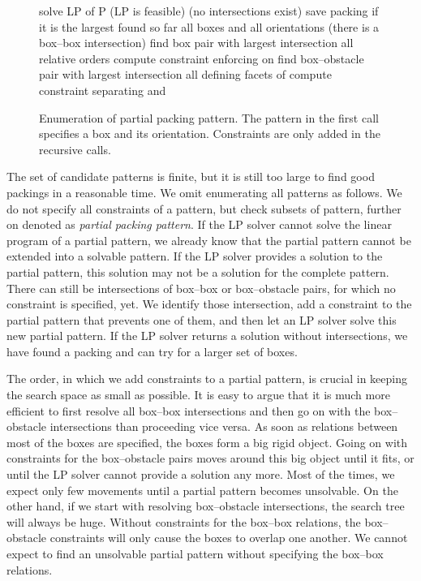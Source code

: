 \documentclass{article}
\begin{document}
\begin{figure}
\begin{codebox}
\Procname{}
\li solve LP of P
\li \If (LP is feasible) \Indentmore
\li \If (no intersections exist) \Indentmore
\li save packing if it is the largest found so far 
\li \For all boxes  and all orientations  \Indentmore
\li  \End
\li \Else \If(there is a box--box intersection)
\li  find box pair  with largest intersection
\li \For all relative orders  \Indentmore
\li compute constraint  enforcing  on 
\li  \End
\li \Else find box--obstacle pair  with largest intersection
\li \For all defining facets of  \Indentmore
\li compute constraint  separating  and 
\li  \End \End \End
\end{codebox}
\caption{\label{fig:patternEnumeration} Enumeration of partial packing
  pattern. The pattern in the first call specifies a box and its
  orientation. Constraints are only added in the recursive calls.}
\end{figure}

The set of candidate patterns is finite, but it is still too large to
find good packings in a reasonable time. We omit enumerating all
patterns as follows. We do not specify all constraints of a pattern,
but check subsets of pattern, further on denoted as \emph{partial
packing pattern}. If the LP solver cannot solve the linear program of
a partial pattern, we already know that the partial pattern cannot be
extended into a solvable pattern. If the LP solver provides a solution
to the partial pattern, this solution may not be a solution for the
complete pattern. There can still be intersections of box--box or
box--obstacle pairs, for which no constraint is specified, yet. We
identify those intersection, add a constraint to the partial pattern
that prevents one of them, and then let an LP solver solve this new
partial pattern. If the LP solver returns a solution without
intersections, we have found a packing and can try for a larger set of
boxes.

The order, in which we add constraints to a partial pattern, is
crucial in keeping the search space as small as possible. It is easy
to argue that it is much more efficient to first resolve all box--box
intersections and then go on with the box--obstacle intersections than
proceeding vice versa. As soon as relations between most of the boxes
are specified, the boxes form a big rigid object. Going on with
constraints for the box--obstacle pairs moves around this big object
until it fits, or until the LP solver cannot provide a solution any
more. Most of the times, we expect only few movements until a partial
pattern becomes unsolvable. On the other hand, if we start with
resolving box--obstacle intersections, the search tree will always be
huge. Without constraints for the box--box relations, the
box--obstacle constraints will only cause the boxes to overlap one
another. We cannot expect to find an unsolvable partial pattern
without specifying the box--box relations.
\end{document}
